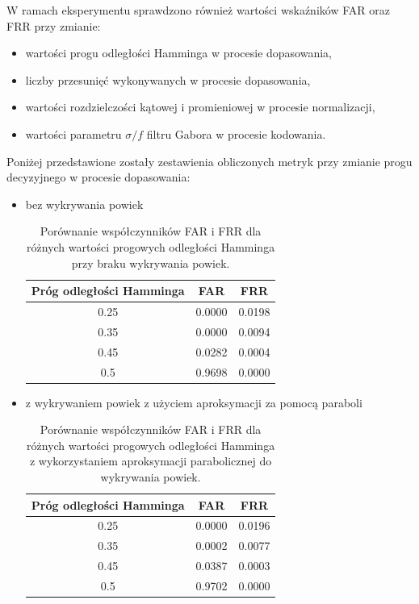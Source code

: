 \documentclass[10pt,polish,a4paper,oneside]{ppfcmthesis}
\begin{document}
\noindent
W ramach eksperymentu sprawdzono również wartości wska\'zników FAR oraz FRR przy zmianie:

\begin{itemize}
  \item wartości progu odległości Hamminga w procesie dopasowania,
  \item liczby przesunię\'c wykonywanych w procesie dopasowania,
  \item wartości rozdzielczości kątowej i promieniowej w procesie normalizacji,
  \item wartości parametru $\mathit{\sigma/f}$ filtru Gabora w procesie kodowania.
\end{itemize}

\noindent
Poniżej przedstawione zostały zestawienia obliczonych metryk przy zmianie progu decyzyjnego
w procesie dopasowania:

\begin{itemize}
  \item bez wykrywania powiek

  \begin{table}[ht]
    \centering
    \begin{tabular}{c|c|c}
      \rowcolor{gray!20}
      Próg odległości Hamminga & FAR & FRR \\
      \hline\hline
      0.25 & 0.0000 & 0.0198 \\
      \hline
      0.35 & 0.0000 & 0.0094 \\
      \hline
      0.45 & 0.0282 & 0.0004 \\
      \hline
      0.5 & 0.9698 & 0.0000 \\
    \end{tabular}
    \caption{Porównanie współczynników FAR i FRR dla różnych wartości progowych odległości Hamminga
    przy braku wykrywania powiek.}
  \end{table}

  \item z wykrywaniem powiek z użyciem aproksymacji za pomocą paraboli

  \begin{table}[ht]
    \centering
    \begin{tabular}{c|c|c}
      \rowcolor{gray!20}
      Próg odległości Hamminga & FAR & FRR \\
      \hline\hline
      0.25 & 0.0000 & 0.0196 \\
      \hline
      0.35 & 0.0002 & 0.0077 \\
      \hline
      0.45 & 0.0387 & 0.0003 \\
      \hline
      0.5 & 0.9702 & 0.0000 \\
    \end{tabular}
    \caption{Porównanie współczynników FAR i FRR dla różnych wartości progowych odległości Hamminga
    z wykorzystaniem aproksymacji parabolicznej do wykrywania powiek.}
  \end{table}
\end{itemize}
\end{document}
